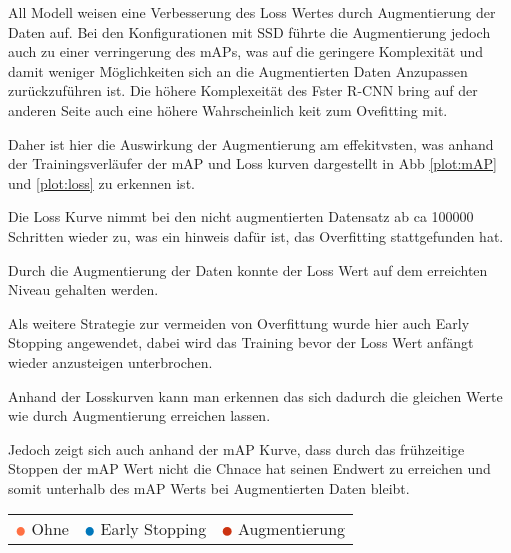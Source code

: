 All Modell weisen eine Verbesserung des Loss Wertes durch 
Augmentierung der Daten auf.
Bei den Konfigurationen mit SSD führte die Augmentierung jedoch auch 
zu einer verringerung des mAPs, was auf die geringere Komplexität 
und damit weniger Möglichkeiten sich an die Augmentierten Daten 
Anzupassen zurückzuführen ist.
Die höhere Komplexeität des Fster R-CNN bring auf der 
anderen Seite auch eine höhere Wahrscheinlich keit zum 
Ovefitting mit.

 
Daher ist hier die Auswirkung der Augmentierung am 
effekitvsten, was anhand der Trainingsverläufer 
der mAP und Loss kurven dargestellt in Abb 
\ref{plot:mAP} und \ref{plot:loss} zu 
erkennen ist.

Die Loss Kurve nimmt bei den nicht augmentierten Datensatz ab 
ca 100000 Schritten wieder zu, was ein hinweis dafür ist, 
das Overfitting stattgefunden hat.

Durch die Augmentierung der Daten konnte der Loss Wert 
auf dem erreichten Niveau gehalten werden.

Als weitere Strategie zur vermeiden von Overfittung wurde 
hier auch Early Stopping angewendet, dabei wird das Training
bevor der Loss Wert anfängt wieder anzusteigen unterbrochen.

Anhand der Losskurven kann man erkennen das sich dadurch 
die gleichen Werte wie durch Augmentierung erreichen lassen.

Jedoch zeigt sich auch anhand der mAP Kurve, dass 
durch das frühzeitige Stoppen der mAP Wert nicht die 
Chnace hat seinen Endwert zu erreichen und somit 
unterhalb des mAP Werts bei Augmentierten Daten bleibt.


\vspace{0.5cm}

\begin{figure}[H]
\begin{minipage}{0.5\textwidth}
  \centering
  \label{plot:mAP}
  \def\svgwidth{0.9\textwidth}
  
\end{minipage}
\begin{minipage}{0.5\textwidth}
  \centering
  \label{plot:Loss}
  \def\svgwidth{0.9\textwidth}
  
\end{minipage}
\end{figure}

\begin{table}[htb]
  \centering
  \begin{tabular}{m{}<{\centering}m{}<{\centering}m{}<{\centering}}
    $\color[HTML]{FF7043}\medbullet$  Ohne & $\color[HTML]{0077BB}\medbullet$  Early Stopping & $\color[HTML]{CC3311}\medbullet$  Augmentierung
  \end{tabular}    
\end{table}

